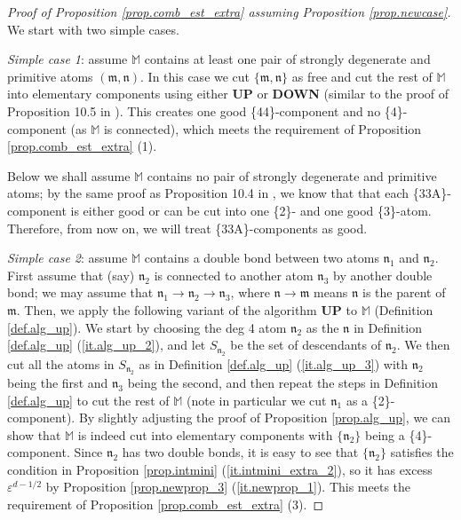 \documentclass[10pt, reqno]{amsart}
\newcommand{\Mb}{\mathbb M}
\newcommand{\mf}{\mathfrak m}
\newcommand{\nf}{\mathfrak n}
\theoremstyle{definition}
\theoremstyle{remark}
\numberwithin{equation}{section}
\begin{document}
\begin{proof}[Proof of Proposition \ref{prop.comb_est_extra} assuming Proposition \ref{prop.newcase}] We start with two simple cases.

\emph{Simple case 1}: assume $\Mb$ contains at least one pair of strongly degenerate and primitive atoms $(\mf,\nf)$. In this case we cut $\{\mf,\nf\}$ as free and cut the rest of $\Mb$ into elementary components using either \textbf{UP} or \textbf{DOWN} (similar to the proof of Proposition 10.5 in \cite{DHM24}). This creates one good \{44\}-component and no \{4\}-component (as $\Mb$ is connected), which meets the requirement of Proposition \ref{prop.comb_est_extra} (1). 

Below we shall assume $\Mb$ contains no pair of strongly degenerate and primitive atoms; by the same proof as Proposition 10.4 in \cite{DHM24}, we know that that each \{33A\}-component is either good or can be cut into one \{2\}- and one good \{3\}-atom. Therefore, from now on, we will treat \{33A\}-components as good.

\emph{Simple case 2}: assume $\Mb$ contains a double bond between two atoms $\nf_1$ and $\nf_2$. First assume that (say) $\nf_2$ is connected to another atom $\nf_3$ by another double bond; we may assume that $\nf_1\rightarrow\nf_2\rightarrow\nf_3$, where $\nf\rightarrow\mf$ means $\nf$ is the parent of $\mf$. Then, we apply the following variant of the algorithm \textbf{UP} to $\Mb$ (Definition \ref{def.alg_up}). We start by choosing the deg 4 atom $\nf_2$ as the $\nf$ in Definition \ref{def.alg_up} (\ref{it.alg_up_2}), and let $S_{\nf_2}$ be the set of descendants of $\nf_2$. We then cut all the atoms in $S_{\nf_2}$ as in Definition \ref{def.alg_up} (\ref{it.alg_up_3}) with $\nf_2$ being the first and $\nf_3$ being the second, and then repeat the steps in Definition \ref{def.alg_up} to cut the rest of $\Mb$ (note in particular we cut $\nf_1$ as a \{2\}-component). By slightly adjusting the proof of Proposition \ref{prop.alg_up}, we can show that $\Mb$ is indeed cut into elementary components with $\{\nf_2\}$ being a \{4\}-component. Since $\nf_2$ has two double bonds, it is easy to see that $\{\nf_2\}$ satisfies the condition in Proposition \ref{prop.intmini} (\ref{it.intmini_extra_2}), so it has excess $\varepsilon^{d-1/2}$ by Proposition \ref{prop.newprop_3} (\ref{it.newprop_1}). This meets the requirement of Proposition \ref{prop.comb_est_extra} (3).


\end{proof}
\end{document}
